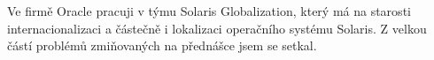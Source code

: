 \documentclass[12pt,a4paper]{report}
\begin{document}
Ve firmě Oracle pracuji v týmu Solaris Globalization, který má na starosti internacionalizaci a částečně i lokalizaci 
operačního systému Solaris. Z velkou částí problémů zmiňovaných na přednášce jsem se setkal. 








\end{document}
